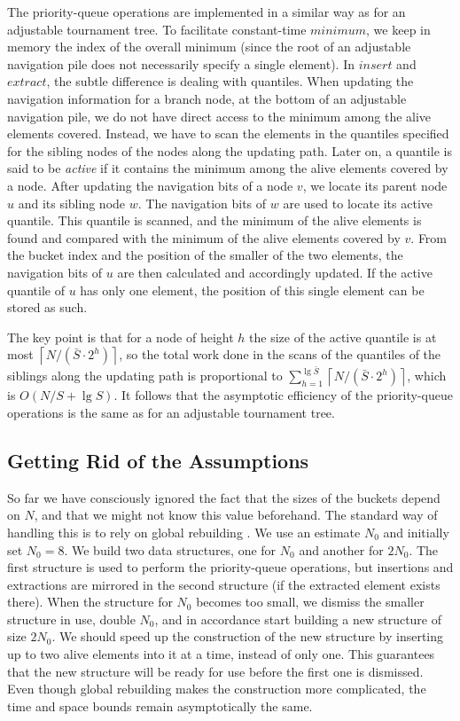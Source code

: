 \documentclass[final,onetabnum,onefignum,onethmnum]{siamltex}
\newcommand{\Minimum}{\mbox{$\mathit{minimum}$}}
\newcommand{\Insert}{\mbox{$\mathit{insert}$}}
\newcommand{\Extract}{\mbox{$\mathit{extract}$}}
\newcommand{\ceils}[1]{\left\lceil #1 \right\rceil}
\begin{document}
The priority-queue operations are implemented in a similar way as
for an adjustable tournament tree. To facilitate constant-time
\Minimum{}, we keep in memory the index of the overall minimum (since
the root of an adjustable navigation pile does not necessarily specify
a single element).  In \Insert{} and \Extract{}, the subtle difference
is dealing with quantiles. When updating the
navigation information for a branch node, at the bottom of an
adjustable navigation pile, we do not have direct access to the
minimum among the alive elements covered. Instead, we have to scan the
elements in the quantiles specified for the sibling nodes of the nodes
along the updating path.  Later on, a quantile is said to be
\emph{active} if it contains the minimum among the alive elements
covered by a node.  After updating the navigation bits of a node $v$,
we locate its parent node $u$ and its sibling node $w$. The navigation bits of
$w$ are used to locate its active quantile.  This quantile is
scanned, and the minimum of the alive elements is found and compared
with the minimum of the alive elements covered by $v$. From the bucket
index and the position of the smaller of the two elements, the
navigation bits of $u$ are then calculated and accordingly
updated. If the active quantile of $u$ has only one element, the
position of this single element can be stored as such.

The key point is that for a node of height $h$ the size of the active
quantile is at most $\ceils{N/(\bar{S} \cdot 2^h)}$, so the total work
done in the scans of the quantiles of the siblings along the updating
path is proportional to $\sum_{h=1}^{\lg \bar{S}} \ceils{N/(\bar{S}
  \cdot 2^h)}$, which is $O(N/S + \lg S)$.  It follows that the
asymptotic efficiency of the priority-queue operations is the same as for an
adjustable tournament tree.

\subsection{Getting Rid of the Assumptions}  So far we have consciously
ignored the fact that the sizes of the buckets depend on $N$, 
and that we might not know this value beforehand. The
standard way of handling this is to rely on global
rebuilding \cite[Chapter V]{Ove83}. We use an estimate $N_0$ and initially set $N_0 = 8$.
We build two data structures, one for $N_0$ and another for $2N_0$. The first structure
is used to perform the priority-queue operations, but insertions and
extractions  are mirrored in the second structure (if the extracted element exists there).  
When the structure for $N_0$ becomes too small, we dismiss the smaller structure
in use, double $N_0$, and in accordance start building a new structure of size $2N_0$. 
We should speed up the construction of the new structure by inserting up to two
alive elements into it at a time, instead of only one. This guarantees
that the new structure will be ready for use before the first one
is dismissed.  Even though global rebuilding makes the
construction more complicated, the time and space
bounds remain asymptotically the same.
\end{document}

